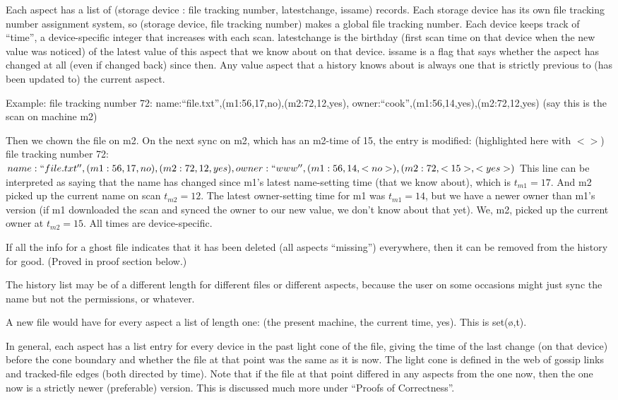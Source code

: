 \documentclass{book}
\begin{document}
Each aspect has a list of (storage device : file tracking number, latestchange, issame) records.
	Each storage device has its own file tracking number assignment system, so (storage device, file tracking number) makes a global file tracking number.
	Each device keeps track of ``time'', a device-specific integer that increases with each scan.
	latestchange is the birthday (first scan time on that device when the new value was noticed) of the latest value of this aspect that we know about on that device.
	issame is a flag that says whether the aspect has changed at all (even if changed back) since then.
Any value aspect that a history knows about is always one that is strictly previous to (has been updated to) the current aspect.

Example:
	file tracking number 72: name:``file.txt'',(m1:56,17,no),(m2:72,12,yes), owner:``cook'',(m1:56,14,yes),(m2:72,12,yes)
(say this is the scan on machine m2)

Then we chown the file on m2.  On the next sync on m2, which has an m2-time of 15, the entry is modified: (highlighted here with $<>$)
	file tracking number 72: $name:``file.txt'',(m1:56,17,no),(m2:72,12,yes), owner:``www'',(m1:56,14,<no>),(m2:72,<15>,<yes>)$
This line can be interpreted as saying that the name has changed since m1's latest name-setting time (that we know about), which is $t_{m1}=17$.  And m2 picked up the current name on scan $t_{m2}=12$.  The latest owner-setting time for m1 was $t_{m1}=14$, but we have a newer owner than m1's version (if m1 downloaded the scan and synced the owner to our new value, we don't know about that yet).  We, m2, picked up the current owner at $t_{m2}=15$.  All times are device-specific.

If all the info for a ghost file indicates that it has been deleted (all aspects ``missing'') everywhere, then it can be removed from the history for good.  (Proved in proof section below.)

The history list may be of a different length for different files or different aspects, because the user on some occasions might just sync the name but not the permissions, or whatever.

A new file would have for every aspect a list of length one: (the present machine, the current time, yes).  This is set(ø,t).

In general, each aspect has a list entry for every device in the past light cone of the file, giving the time of the last change (on that device) before the cone boundary and whether the file at that point was the same as it is now.  The light cone is defined in the web of gossip links and tracked-file edges (both directed by time).  Note that if the file at that point differed in any aspects from the one now, then the one now is a strictly newer (preferable) version.  This is discussed much more under ``Proofs of Correctness''.
\end{document}
